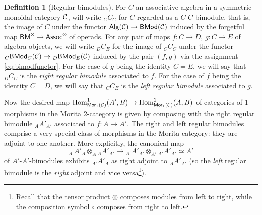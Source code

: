 \documentclass[10pt, reqno, twoside
, final
]{amsart}
\numberwithin{equation}{subsection}%
\theoremstyle{definition}
\newtheorem{defn}{Definition}[subsection]
\theoremstyle{definition}
\theoremstyle{definition}
\theoremstyle{definition}
\theoremstyle{definition}
\theoremstyle{definition}
\theoremstyle{definition}
\theoremstyle{definition}
\theoremstyle{definition}
\theoremstyle{plain}
\theoremstyle{definition}
\theoremstyle{plain}
\theoremstyle{definition}
\theoremstyle{plain}
\theoremstyle{definition}
\theoremstyle{definition}
\theoremstyle{plain}
\theoremstyle{plain}
\theoremstyle{definition}
\theoremstyle{plain}
\theoremstyle{plain}
\theoremstyle{plain}
\begin{document}
\begin{defn}[Regular bimodules]
For $C$ an associative algebra in a symmetric monoidal category $\mathcal{C}$, will write ${}_CC_C$ for $C$ regarded as a $C$-$C$-bimodule, that is, the image of $C$ under the functor $\mathsf{Alg}(\mathcal{C})\rightarrow \mathsf{BMod}(\mathcal{C})$ induced by the forgetful map $\mathsf{BM}^{\otimes}\rightarrow \mathsf{Assoc}^{\otimes}$ of operads. For any pair of maps $f:C\rightarrow D$, $g:C\rightarrow E$ of algebra objects, we will write ${}_DC_{E}$ for the image of ${}_CC_C$ under the functor ${}_C\mathsf{BMod}_{C}(\mathcal{C})\rightarrow {}_D\mathsf{BMod}_{E}(\mathcal{C})$ induced by the pair $(f,g)$ via the assignment \eqref{eq:bimodfunctor}. For the case of $g$ being the identity $C=E$, we will say that ${}_D{C}_C$ is the \emph{right regular bimodule} associated to $f$. For the case of $f$ being the identity $C=D$, we will say that ${}_CC_E$ is the \emph{left regular bimodule} associated to $g$.
\end{defn}
Now the desired map $\mathrm{Hom}^1_{\mathsf{Mor}_1(\mathcal{C})}(A',B)\rightarrow \mathrm{Hom}^1_{\mathsf{Mor}_1(\mathcal{C})}(A,B)$ of categories of 1-morphisms in the Morita 2-category is given by composing with the right regular bimodule ${}_AA'_{A'}$ associated to $f:A\rightarrow A'$. The right and left regular bimodules comprise a very special class of morphisms in the Morita category: they are adjoint to one another. More explicitly, the canonical map 
\[  {}_{A'}A'_{A}\otimes_{A}{}_{A}A'_{A'}\longrightarrow {}_{A'}A'_{A'}\otimes_{A'} {}_{A'}A'_{A'}\simeq A' \]
of $A'$-$A'$-bimodules exhibits ${}_{A'}A'_A$ as right adjoint to ${}_AA'_{A'}$ (so the \emph{left} regular bimodule is the \emph{right} adjoint and vice versa\footnote{Recall that the tensor product $\otimes$ composes modules from left to right, while the composition symbol $\circ$ composes from right to left.}).
\end{document}
